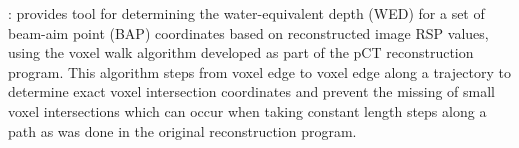 \begin{tcbfunctionenv}
\begin{tcbparagraph}
\begin{deepList}[labelindent=1pt, leftmargin=*]
\begin{deepList}[labelindent=1pt, leftmargin=*]
		\item {} : provides tool for determining the water-equivalent depth (WED) for a set of beam-aim point (BAP) coordinates based on reconstructed image RSP values, using the voxel walk algorithm developed as part of the pCT reconstruction program.  This algorithm steps from voxel edge to voxel edge along a trajectory to determine exact voxel intersection coordinates and prevent the missing of small voxel intersections which can occur when taking constant length steps along a path as was done in the original reconstruction program.
	\end{deepList}
\end{deepList}
\end{tcbparagraph}
\end{tcbfunctionenv}

